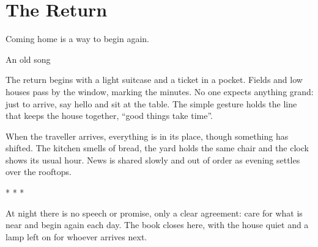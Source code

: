 \chapter{The Return}

\epigraph{Coming home is a way to begin again.}{An old song}

The return begins with a light suitcase and a ticket in a pocket. Fields and
low houses pass by the window, marking the minutes. No one expects anything
grand: just to arrive, say hello and sit at the table. The simple gesture
holds the line that keeps the house together, \enquote{good things take time}.

When the traveller arrives, everything is in its place, though something
has shifted. The kitchen smells of bread, the yard holds the same chair and
the clock shows its usual hour. News is shared slowly and out of order as
evening settles over the rooftops.

\begin{center}
  * * *
\end{center}

At night there is no speech or promise, only a clear agreement: care for
what is near and begin again each day. The book closes here, with the house
quiet and a lamp left on for whoever arrives next.
